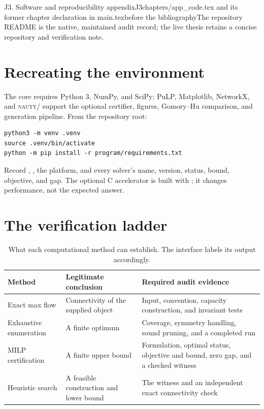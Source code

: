 \begin{offcut}{J3. Software and reproducibility appendix}{J3}{chapters/app\_code.tex and its former chapter declaration in main.tex}{before the bibliography}{The repository README is the native, maintained audit record; the live thesis retains a concise repository and verification note.}
\section{Recreating the environment}\label{app:software-environment}

The core requires Python 3, NumPy, and SciPy; PuLP, Matplotlib, NetworkX, and \textsc{nauty}/ support the optional certifier, figures, Gomory--Hu comparison, and generation pipeline. From the repository root:
\begin{verbatim}
python3 -m venv .venv
source .venv/bin/activate
python -m pip install -r program/requirements.txt
\end{verbatim}
Record , , the platform, and every solver's name, version, status, bound, objective, and gap. The optional C accelerator is built with ; it changes performance, not the expected answer.

\section{The verification ladder}

\begin{table}[ht]
  \centering
  \small
  \begin{tabularx}{\textwidth}{@{}>{\raggedright\arraybackslash}p{}>{\raggedright\arraybackslash}p{}>{\raggedright\arraybackslash}X@{}}
    \toprule
    Method & Legitimate conclusion & Required audit evidence \\
    \midrule
    Exact max flow & Connectivity of the supplied object & Input, convention, capacity construction, and invariant tests \\
    Exhaustive enumeration & A finite optimum & Coverage, symmetry handling, sound pruning, and a completed run \\
    MILP certification & A finite upper bound & Formulation, optimal status, objective and bound, zero gap, and a checked witness \\
    Heuristic search & A feasible construction and lower bound & The witness and an independent exact connectivity check \\
    \bottomrule
  \end{tabularx}
  \caption{What each computational method can establish. The  interface labels its output accordingly.}
  \label{tab:software-evidence}
\end{table}


\end{offcut}
